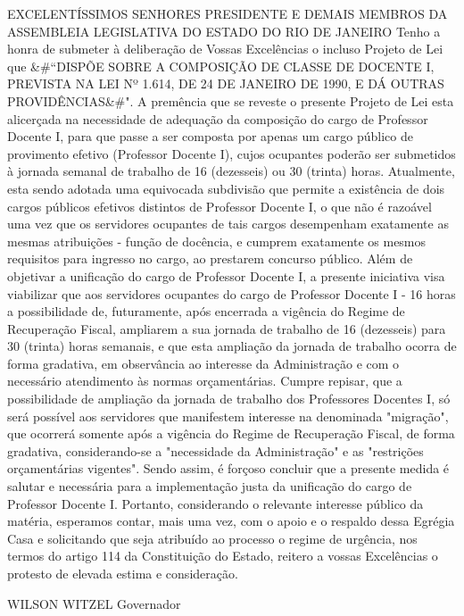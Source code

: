 \documentclass[10pt]{article}
\begin{document}
EXCELENTÍSSIMOS SENHORES PRESIDENTE E DEMAIS MEMBROS DA ASSEMBLEIA LEGISLATIVA DO ESTADO DO RIO DE JANEIRO
Tenho a honra de submeter à deliberação de Vossas Excelências o incluso Projeto de Lei que &#``DISPÕE SOBRE A COMPOSIÇÃO DE CLASSE DE DOCENTE I, PREVISTA NA LEI Nº 1.614, DE 24 DE JANEIRO DE 1990, E DÁ OUTRAS PROVIDÊNCIAS&#".
A premência que se reveste o presente Projeto de Lei esta alicerçada na necessidade de adequação da composição do cargo de Professor Docente I, para que passe a ser composta por apenas um cargo público de provimento efetivo (Professor Docente I), cujos ocupantes poderão ser submetidos à jornada semanal de trabalho de 16 (dezesseis) ou 30 (trinta) horas.
Atualmente, esta sendo adotada uma equivocada subdivisão que permite a existência de dois cargos públicos efetivos distintos de Professor Docente I, o que não é razoável uma vez que os servidores ocupantes de tais cargos desempenham exatamente as mesmas atribuições - função de docência, e cumprem exatamente os mesmos requisitos para ingresso no cargo, ao prestarem concurso público. 
Além de objetivar a unificação do cargo de Professor Docente I, a presente iniciativa visa viabilizar que aos servidores ocupantes do cargo de Professor Docente I - 16 horas a possibilidade de, futuramente, após encerrada a vigência do Regime de Recuperação Fiscal, ampliarem a sua jornada de trabalho de 16 (dezesseis) para 30 (trinta) horas semanais, e que  esta ampliação da jornada de trabalho ocorra de forma gradativa, em observância ao interesse da Administração e com o necessário atendimento às normas orçamentárias.
Cumpre repisar, que a possibilidade de ampliação da jornada de trabalho dos Professores Docentes I, só será possível aos servidores que manifestem interesse na denominada "migração", que ocorrerá somente após a vigência do Regime de Recuperação Fiscal, de forma gradativa, considerando-se a "necessidade da Administração" e as "restrições orçamentárias vigentes".
Sendo assim, é forçoso concluir que a presente medida é salutar e necessária para a implementação justa da unificação do cargo de Professor Docente I.
Portanto, considerando o relevante interesse público da matéria, esperamos contar, mais uma vez, com o apoio e o respaldo dessa Egrégia Casa e solicitando que seja atribuído ao processo o regime de urgência, nos termos do artigo 114 da Constituição do Estado, reitero a vossas Excelências o protesto de elevada estima e consideração.



WILSON WITZEL
Governador



\iffalse
\begin{center}
  \textbf{REFERÊNCIAS}
\end{center}


\fi
\end{document}

